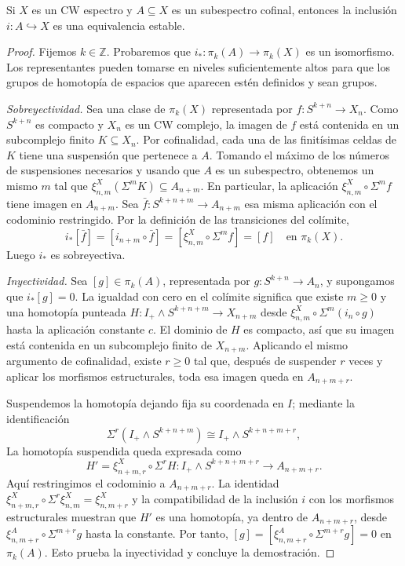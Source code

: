 \begin{lema}\label{lema:c11-cofinal-equivalencia}
Si $X$ es un CW espectro y $A\subseteq X$ es un subespectro cofinal, entonces la inclusión $i\colon A\hookrightarrow X$ es una equivalencia estable.
\end{lema}
\begin{proof}
Fijemos $k\in\mathbb Z$. Probaremos que $i_*\colon\pi_k(A)\to\pi_k(X)$ es un isomorfismo. Los representantes pueden tomarse en niveles suficientemente altos para que los grupos de homotopía de espacios que aparecen estén definidos y sean grupos.

\emph{Sobreyectividad.} Sea una clase de $\pi_k(X)$ representada por $f\colon S^{k+n}\to X_n$. Como $S^{k+n}$ es compacto y $X_n$ es un CW complejo, la imagen de $f$ está contenida en un subcomplejo finito $K\subseteq X_n$. Por cofinalidad, cada una de las finitísimas celdas de $K$ tiene una suspensión que pertenece a $A$. Tomando el máximo de los números de suspensiones necesarios y usando que $A$ es un subespectro, obtenemos un mismo $m$ tal que $\xi^X_{n,m}(\Sigma^mK)\subseteq A_{n+m}$. En particular, la aplicación $\xi^X_{n,m}\circ\Sigma^m f$ tiene imagen en $A_{n+m}$. Sea $\bar f\colon S^{k+n+m}\to A_{n+m}$ esa misma aplicación con el codominio restringido. Por la definición de las transiciones del colímite,
\[
i_*[\bar f]
=[i_{n+m}\circ\bar f]
=[\xi^X_{n,m}\circ\Sigma^m f]
=[f]\quad\text{en }\pi_k(X).
\]
Luego $i_*$ es sobreyectiva.

\emph{Inyectividad.} Sea $[g]\in\pi_k(A)$, representada por $g\colon S^{k+n}\to A_n$, y supongamos que $i_*[g]=0$. La igualdad con cero en el colímite significa que existe $m\ge0$ y una homotopía punteada $H\colon I_+\wedge S^{k+n+m}\to X_{n+m}$ desde $\xi^X_{n,m}\circ\Sigma^m(i_n\circ g)$ hasta la aplicación constante $c$. El dominio de $H$ es compacto, así que su imagen está contenida en un subcomplejo finito de $X_{n+m}$. Aplicando el mismo argumento de cofinalidad, existe $r\ge0$ tal que, después de suspender $r$ veces y aplicar los morfismos estructurales, toda esa imagen queda en $A_{n+m+r}$.

Suspendemos la homotopía dejando fija su coordenada en $I$; mediante la identificación
\[
\Sigma^r(I_+\wedge S^{k+n+m})\cong I_+\wedge S^{k+n+m+r},
\]
La homotopía suspendida queda expresada como
\[
H'=\xi^X_{n+m,r}\circ\Sigma^rH
\colon I_+\wedge S^{k+n+m+r}\longrightarrow A_{n+m+r}.
\]
Aquí restringimos el codominio a $A_{n+m+r}$. La identidad $\xi^X_{n+m,r}\circ\Sigma^r\xi^X_{n,m}=\xi^X_{n,m+r}$ y la compatibilidad de la inclusión $i$ con los morfismos estructurales muestran que $H'$ es una homotopía, ya dentro de $A_{n+m+r}$, desde $\xi^A_{n,m+r}\circ\Sigma^{m+r}g$ hasta la constante. Por tanto, $[g]=[\xi^A_{n,m+r}\circ\Sigma^{m+r}g]=0$ en $\pi_k(A)$. Esto prueba la inyectividad y concluye la demostración.
\end{proof}

